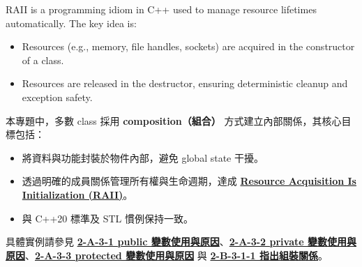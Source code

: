 \documentclass[a4paper,12pt]{article}
\begin{document}
\label{RAII}
RAII is a programming idiom in C++ used to manage resource lifetimes automatically. The key idea is:
\begin{itemize}
    \item Resources (e.g., memory, file handles, sockets) are acquired in the constructor of a class.
    \item Resources are released in the destructor, ensuring deterministic cleanup and exception safety.
\end{itemize}
本專題中，多數 class 採用 \textbf{composition（組合）} 方式建立內部關係，其核心目標包括：
\begin{itemize}
\item 將資料與功能封裝於物件內部，避免 global state 干擾。
\item 透過明確的成員關係管理所有權與生命週期，達成 \hyperref[raii]{\textbf{Resource Acquisition Is Initialization (RAII)}}。
\item 與 C++20 標準及 STL 慣例保持一致。
\end{itemize}
具體實例請參見 \hyperref[2-A-3-1]{\textbf{2-A-3-1 public 變數使用與原因}}、\hyperref[2-A-3-2]{\textbf{2-A-3-2 private 變數使用與原因}}、\hyperref[2-A-3-3]{\textbf{2-A-3-3 protected 變數使用與原因}} 與 \hyperref[2-B-3-1-1]{\textbf{2-B-3-1-1 指出組裝關係}}。
\label{2-B-1-1}
\end{document}

